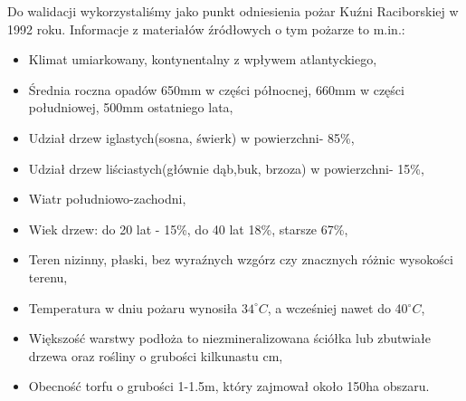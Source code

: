 \documentclass[a4paper, 11pt]{article}
\begin{document}
	Do walidacji wykorzystaliśmy jako punkt odniesienia pożar Kuźni Raciborskiej w 1992 roku.
	Informacje z materiałów źródłowych o tym pożarze to m.in.:
	\begin{itemize}
		\item Klimat umiarkowany, kontynentalny z wpływem atlantyckiego,
		\item Średnia roczna opadów 650mm w części północnej, 660mm w części południowej, 500mm ostatniego lata,
		\item Udział drzew iglastych(sosna, świerk) w powierzchni- 85\%,
		\item Udział drzew liściastych(głównie dąb,buk, brzoza) w powierzchni- 15\%,
		\item Wiatr południowo-zachodni,
		\item Wiek drzew: do 20 lat - 15\%, do 40 lat 18\%, starsze 67\%,
		\item Teren nizinny, płaski, bez wyraźnych wzgórz czy znacznych różnic wysokości terenu,
		\item Temperatura w dniu pożaru wynosiła $34^\circ C$, a wcześniej nawet do 40$^\circ C$,
		\item Większość warstwy podłoża to niezmineralizowana ściółka lub zbutwiałe drzewa oraz rośliny o grubości kilkunastu cm,
		\item Obecność torfu o grubości 1-1.5m, który zajmował około 150ha obszaru.
	\end{itemize}
\end{document}
